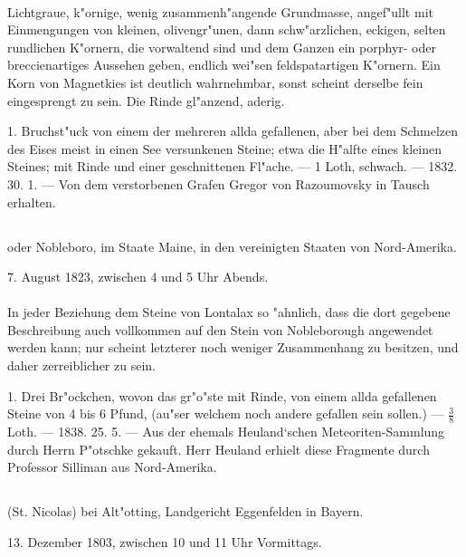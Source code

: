 \documentclass[a4paper, 11pt, oneside, polutonikogreek, german]{article}
\begin{document}
\paragraph{}
Lichtgraue, k"ornige, wenig zusammenh"angende Grundmasse, angef"ullt mit Einmengungen von kleinen, olivengr"unen, dann schw"arzlichen, eckigen, selten rundlichen K"ornern, die vorwaltend sind und dem Ganzen ein porphyr- oder breccienartiges Aussehen geben, endlich wei"sen feldspatartigen K"ornern. Ein Korn von Magnetkies ist deutlich wahrnehmbar, sonst scheint derselbe fein eingesprengt zu sein. Die Rinde gl"anzend, aderig.

1. Bruchst"uck von einem der mehreren allda gefallenen, aber bei dem Schmelzen des Eises meist in einen See versunkenen Steine; etwa die H"alfte eines kleinen Steines; mit Rinde und einer geschnittenen Fl"ache. --- 1 Loth, schwach. --- 1832. 30. 1. --- Von dem verstorbenen Grafen Gregor von Razoumovsky in Tausch erhalten.
\subsection[\swabfamily {Nobleborough.}]{}
\begin{center}

oder Nobleboro, im Staate Maine, in den vereinigten Staaten von Nord-Amerika.

7. August 1823, zwischen 4 und 5 Uhr Abends.
\end{center}
\paragraph{}
In jeder Beziehung dem Steine von Lontalax so "ahnlich, dass die dort gegebene Beschreibung auch vollkommen auf den Stein von Nobleborough angewendet werden kann; nur scheint letzterer noch weniger Zusammenhang zu besitzen, und daher zerreiblicher zu sein.

1. Drei Br"ockchen, wovon das gr"o"ste mit Rinde, von einem allda gefallenen Steine von 4 bis 6 Pfund, (au"ser welchem noch andere gefallen sein sollen.) --- $\mathfrak{\frac{3}{8}}$ Loth. --- 1838. 25. 5. --- Aus der ehemals Heuland‘schen Meteoriten-Sammlung durch Herrn P"otschke gekauft. Herr Heuland erhielt diese Fragmente durch Professor Silliman aus Nord-Amerika.
\subsection{}
\begin{center}

(St. Nicolas) bei Alt"otting, Landgericht Eggenfelden in Bayern.

13. Dezember 1803, zwischen 10 und 11 Uhr Vormittags.
\end{center}
\end{document}
